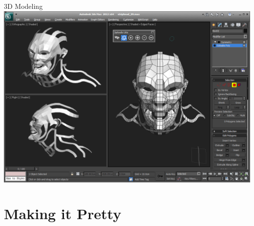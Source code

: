 \documentclass{lug}
\begin{document}
\begin{frame}{3D Modeling}
{    }{
        \includegraphics[width=\textwidth]{graphics/strip_head}
    }
        
\end{frame}

\section{Making it Pretty}
\end{document}
